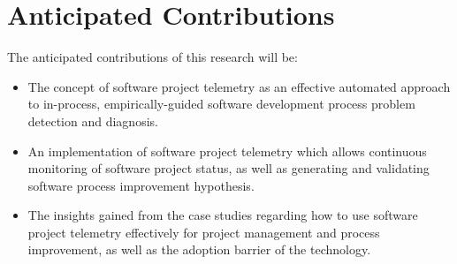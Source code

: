 








\section{Anticipated Contributions}  \label{Intro:Contribution}


The anticipated contributions of this research will be:

\begin{itemize}
	\item The concept of software project telemetry as an effective automated approach to in-process, empirically-guided software development process problem detection and diagnosis. 
  
  \item An implementation of software project telemetry which allows continuous monitoring of software project status, as well as generating and validating software process improvement hypothesis.
  
  \item The insights gained from the case studies regarding how to use software project telemetry effectively for project management and process improvement, as well as the adoption barrier of the technology.

\end{itemize}








